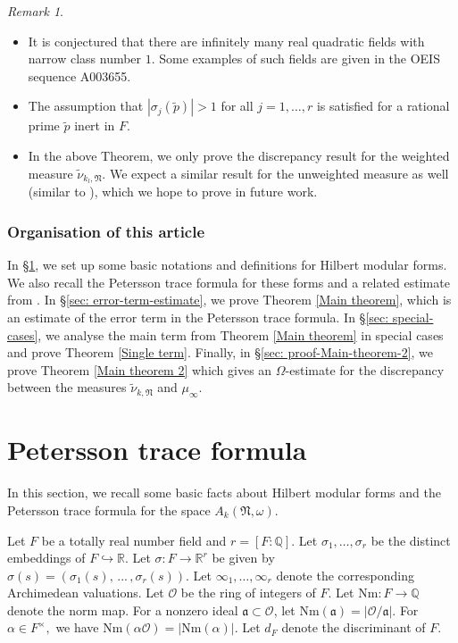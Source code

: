 \documentclass[reqno]{amsart}
\theoremstyle{plain}
\theoremstyle{definition}
\theoremstyle{remark}
\newtheorem{remark}{Remark}
\def\Q{\mathbb{Q}}
\def\Nr{\mathrm{Nm}}
\def\R{\mathbb R}
\def\Q{\mathbb Q}
\def\R{\mathbb R}
\begin{document}
\begin{remark}
    \begin{itemize}
        \item It is conjectured that there are infinitely many real quadratic fields with narrow class number $1$. Some examples of such fields are given in the OEIS sequence A003655.
        \item  The assumption that $|\sigma_j(\tilde{p})| > 1 $ for all $j = 1, \dots, r$ is satisfied for a rational prime $\tilde{p}$ inert in $F$.
        \item In the above Theorem, we only prove the discrepancy result for the weighted measure $\tilde{\nu}_{k_l,\mathfrak{N}}$. We expect a similar result for the unweighted measure as well (similar to \cite{JS}), which we hope to prove in future work.
    \end{itemize}
\end{remark}

\subsubsection*{Organisation of this article} In \S  \ref{sec: Peetersson-trace-formula}, we set up some basic notations and definitions for Hilbert modular forms. We also recall the Petersson trace formula for these forms and a related estimate from \cite{KL}. In \S \ref{sec: error-term-estimate}, we prove Theorem \ref{Main theorem}, which is an estimate of the error term in the Petersson trace formula. In \S \ref{sec: special-cases}, we analyse the main term from Theorem \ref{Main theorem} in special cases and prove Theorem \ref{Single term}. Finally, in \S \ref{sec: proof-Main-theorem-2}, we prove Theorem \ref{Main theorem 2} which gives an $\Omega$-estimate for the discrepancy between the measures $\tilde{\nu}_{k,\mathfrak{N}}$ and $\mu_\infty$.

\bigskip



\section{Petersson trace formula}\label{sec: Peetersson-trace-formula}
In this section, we recall some basic facts about Hilbert modular forms and the Petersson trace formula for the space $A_k(\mathfrak{N},\omega)$. 

 Let $F $ be a totally real number field and $r=[F :\Q].$  Let $\sigma_1, \dots,  \sigma_r$ be the distinct embeddings of $F \hookrightarrow \mathbb{R}.$ Let $\sigma: F\rightarrow \R^r$ be given by $\sigma(s)=(\sigma_1(s),\,...\,,\sigma_r(s))$.  Let $\infty_1, \dots,\infty_r$ denote the corresponding Archimedean valuations. Let $\mathcal{O}$ be the ring of integers of $F$. Let $\Nr :F\rightarrow \mathbb{Q}$ denote the norm map. For a nonzero ideal $\mathfrak{a}\subset \mathcal{O} $, let $\Nr(\mathfrak{a})=|\mathcal{O}/\mathfrak{a}|.$ For $\alpha \in F^\times,$ we have
$\Nr(\alpha\mathcal{O})=|\Nr(\alpha)|.$  Let $d_F$ denote the discriminant of $F$.
\end{document}
